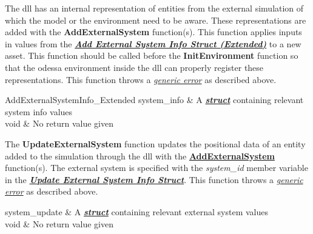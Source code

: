 %

    \hspace{\parindent}\unclass The \gls{dll} has an internal representation of entities from the external simulation of which the model or the environment need to be aware. These representations are added with the \textcolor{red5}{\textbf{AddExternalSystem}} function(s). This function applies inputs in values from the \textbf{\textit{\hyperref[tab:addExternalSystemExtendedStruct]{Add External System Info Struct (Extended)}}} to a new asset. This function should be called before the \textcolor{red5}{\textbf{InitEnvironment}} function so that the \gls{odessa} environment inside the \gls{dll} can properly register these representations. This function throws a \hyperlink{genericerror}{\textit{generic error}} as described above.

    {
        \scriptsize{AddExternalSystemInfo\_Extended} \normalsize{system\_info} & A \textbf{\textit{\hyperref[tab:addtargetstruct]{struct}}} containing relevant system info values\\
    }{
        void                                                                   & No return value given\\
    }
%
%

    \hspace{\parindent}\unclass The \textcolor{red5}{\textbf{UpdateExternalSystem}} function updates the positional data of an entity added to the simulation through the \gls{dll} with the \hyperref[tab:AddExternalSystem]{\textcolor{red5}{\textbf{AddExternalSystem}}} function(s). The external system is specified with the \textit{system\_id} member variable in the \textbf{\textit{\hyperref[tab:updatetargetstruct]{Update External System Info Struct}}}. This function throws a \hyperlink{genericerror}{\textit{generic error}} as described above.

    {
        system\_update & A \textbf{\textit{\hyperref[tab:updatetargetstruct]{struct}}} containing relevant external system values\\
    }{
        void           & No return value given\\
    }

